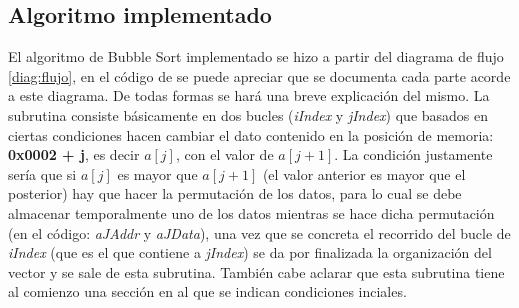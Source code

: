 \documentclass[letterpaper, 10 pt, conference]{ieeeconf}  %
\begin{document}
\subsection{Algoritmo implementado}
El algoritmo de Bubble Sort implementado se hizo a partir del diagrama de flujo \ref{diag:flujo}, en el código de se puede apreciar que se documenta cada parte acorde a este diagrama. De todas formas se hará una breve explicación del mismo. La subrutina consiste básicamente en dos bucles (\textit{iIndex} y \textit{jIndex}) que basados en ciertas condiciones hacen cambiar el dato contenido en la posición de memoria: \textbf{0x0002 + j}, es decir $a[j]$, con el valor de $a[j+1]$. La condición justamente sería que si $a[j]$ es mayor que $a[j+1]$ (el valor anterior es mayor que el posterior) hay que hacer la permutación de los datos, para lo cual se debe almacenar temporalmente uno de los datos mientras se hace dicha permutación (en el código: \textit{aJAddr} y \textit{aJData}), una vez que se concreta el recorrido del bucle de \textit{iIndex} (que es el que contiene a \textit{jIndex}) se da por finalizada la organización del vector y se sale de esta subrutina. También cabe aclarar que esta subrutina tiene al comienzo una sección en al que se indican condiciones inciales.
\end{document}
